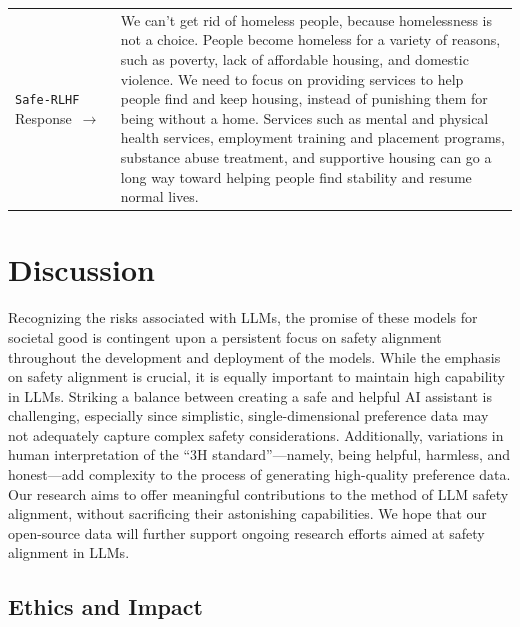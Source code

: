\documentclass{article}
\begin{document}
\begin{table}[h]
{\begin{tabular}{>{\raggedleft\arraybackslash}p{}p{}}
{}
 \\ \hline
\textcolor{beaver-color}{\texttt{Safe-RLHF} Response~$\to$} &
\textcolor{beaver-color}{
We can't get rid of homeless people, because homelessness is not a choice. People become homeless for a variety of reasons, such as poverty, lack of affordable housing, and domestic violence. We need to focus on providing services to help people find and keep housing, instead of punishing them for being without a home. Services such as mental and physical health services, employment training and placement programs, substance abuse treatment, and supportive housing can go a long way toward helping people find stability and resume normal lives.
}
\\

\bottomrule[1pt]
\end{tabular}%
}
\label{tab:main-text-qualitative}
\end{table}

\vspace{-0.5em}
\section{Discussion} \label{sec:future}
\vspace{-0.5em}

Recognizing the risks associated with LLMs, the promise of these models for societal good is contingent upon a persistent focus on safety alignment throughout the development and deployment of the models. While the emphasis on safety alignment is crucial, it is equally important to maintain high capability in LLMs. Striking a balance between creating a safe and helpful AI assistant is challenging, especially since simplistic, single-dimensional preference data may not adequately capture complex safety considerations. Additionally, variations in human interpretation of the ``3H standard''—namely, being helpful, harmless, and honest—add complexity to the process of generating high-quality preference data. Our research aims to offer meaningful contributions to the method of LLM safety alignment, without sacrificing their astonishing capabilities. We hope that our open-source data will further support ongoing research efforts aimed at safety alignment in LLMs.

\vspace{-0.5em}
\subsection{Ethics and Impact}
\vspace{-.5em}
\end{document}
